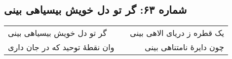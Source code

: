 \begin{center}
\section*{شماره ۶۳: گر تو دل خویش بیسیاهی بینی}
\label{sec:063}
\begin{longtable}{l p{0.5cm} r}
گر تو دل خویش بیسیاهی بینی
&&
یک قطره ز دریای الاهی بینی
\\
وان نقطهٔ توحید که در جان داری
&&
چون دایرهٔ نامتناهی بینی
\\
\end{longtable}
\end{center}
